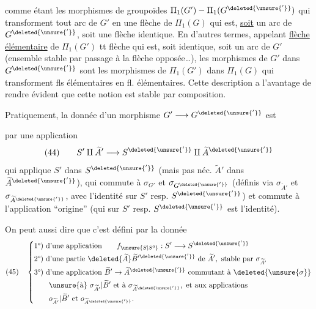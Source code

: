 comme étant les morphismes de groupoïdes $\Pi_1(G')-\Pi_1(G^{\deleted{\unsure{'}}})$ qui transforment tout arc de $G'$ en une flèche de $\Pi_1(G)$ qui est, \uline{soit} un arc de $G^{\deleted{\unsure{'}}}$, soit une flèche identique. En d'autres termes, appelant \uline{flèche élémentaire} de $\Pi_1(G')$ tt flèche qui est, soit identique, soit un arc de $G'$ (ensemble  stable par passage à la flèche opposée\ldots), les morphismes   de $G'$ dans $G^{\deleted{\unsure{'}}}$ sont les morphismes de $\Pi_1(G')$ dans $\Pi_1(G)$ qui transforment fls élémentaires en fl. élémentaires. Cette description a l'avantage de rendre évident que cette notion est stable par composition.

Pratiquement, la donnée d'un morphisme    $G'\longrightarrow G^{\deleted{\unsure{'}}}$ est 

par une application
\[
(44)\qquad S'\amalg\widetilde A'\longrightarrow S^{\deleted{\unsure{'}}}\amalg\widetilde A^{\deleted{\unsure{'}}}
\]
qui applique $S'$ dans $S^{\deleted{\unsure{'}}}$ (mais pas néc. $\widetilde A'$ dans $\widetilde A^{\deleted{\unsure{'}}}$), qui commute à $\sigma_{G'}$ et $\sigma_{G^{\deleted{\unsure{'}}}}$ (définis via $\sigma_{\widetilde A'}$ et $\sigma_{\widetilde A^{\deleted{\unsure{'}}}}$, avec l'identité sur $S'$ resp. $S^{\deleted{\unsure{'}}}$) et commute à l'application ``origine'' (qui sur $S'$ resp. $S^{\deleted{\unsure{'}}}$ est l'identité).

On peut aussi dire que c'est défini par la donnée
\[
(45)\quad\left\{\begin{aligned}
&\text{1°) d'une application}\qquad f_{\unsure{S|S^0}}:S'\longrightarrow S^{\deleted{\unsure{'}}}\\
&\text{2°) d'une partie }\deleted{\widetilde A}\widetilde B^{\prime\deleted{\unsure{'}}}\text{ de }\widetilde A',\text{ stable par }\sigma_{\widetilde A'}\\
&\text{3°) d'une application }\widetilde B'\to\widetilde A^{\deleted{\unsure{'}}}\text{ commutant à }\deleted{\unsure{\sigma}}\\
&\qquad\unsure{\text{à}}\ \sigma_{\widetilde A'}|\widetilde B'\text{ et à }\sigma_{\widetilde A^{\deleted{\unsure{'}}}},\text{ et aux applications}\\
&\qquad o_{\widetilde A'}|\widetilde B'\text{ et }o_{\widetilde A^{\deleted{\unsure{'}}}}.
\end{aligned}\right.
\]

